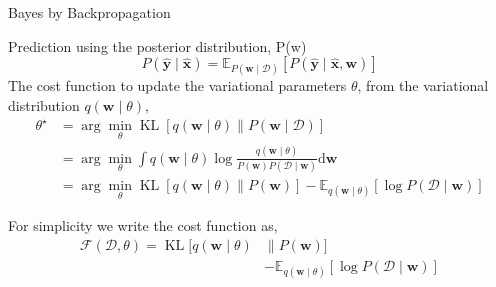 \documentclass[8pt,xcolor=dvipsnames,compress]{beamer}
\begin{document}
\begin{frame}{Bayes by Backpropagation}

Prediction using the posterior distribution, P(w)\\
\begin{equation}
P(\hat{\mathbf{y}} \mid \hat{\mathbf{x}})=\mathbb{E}_{P(\mathbf{w} \mid \mathcal{D})}[P(\hat{\mathbf{y}} \mid \hat{\mathbf{x}}, \mathbf{w})]
\end{equation}
The cost function to update the variational parameters $\theta$, from the variational distribution $q(\mathbf{w} \mid \theta)$,  \\

\begin{equation}
\begin{aligned}
\theta^{\star} & =\arg \min _{\theta} \operatorname{KL}[q(\mathbf{w} \mid \theta) \| P(\mathbf{w} \mid \mathcal{D})] \\
& =\arg \min _{\theta} \int q(\mathbf{w} \mid \theta) \log \frac{q(\mathbf{w} \mid \theta)}{P(\mathbf{w}) P(\mathcal{D} \mid \mathbf{w})} \mathrm{d} \mathbf{w} \\
& =\arg \min _{\theta} \operatorname{KL}[q(\mathbf{w} \mid \theta) \| P(\mathbf{w})]-\mathbb{E}_{q(\mathbf{w} \mid \theta)}[\log P(\mathcal{D} \mid \mathbf{w})]
\end{aligned}
\end{equation}

For simplicity we write the cost function as, 
\begin{equation}
\begin{aligned}
\mathcal{F}(\mathcal{D}, \theta)=\operatorname{KL}[q(\mathbf{w} \mid \theta) & \| P(\mathbf{w})] \\
& -\mathbb{E}_{q(\mathbf{w} \mid \theta)}[\log P(\mathcal{D} \mid \mathbf{w})]
\end{aligned}
\end{equation}

\end{frame}
\end{document}
